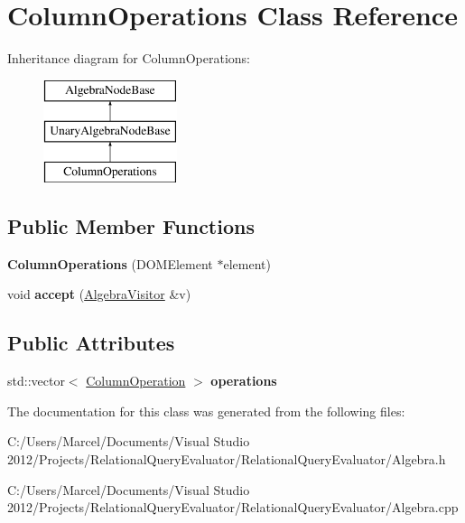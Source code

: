 \hypertarget{class_column_operations}{\section{Column\+Operations Class Reference}
\label{class_column_operations}
}
Inheritance diagram for Column\+Operations\+:\begin{figure}[H]
\begin{center}
\leavevmode
\includegraphics[height=3.000000cm]{class_column_operations}
\end{center}
\end{figure}
\subsection*{Public Member Functions}
\begin{DoxyCompactItemize}
\item 
\hypertarget{class_column_operations_a3d2c43e31201238da369906ef863c959}{{\bfseries Column\+Operations} (D\+O\+M\+Element $\ast$element)}\label{class_column_operations_a3d2c43e31201238da369906ef863c959}

\item 
\hypertarget{class_column_operations_aa33d719aa0407f588cd4ddc2d54368a6}{void {\bfseries accept} (\hyperlink{class_algebra_visitor}{Algebra\+Visitor} \&v)}\label{class_column_operations_aa33d719aa0407f588cd4ddc2d54368a6}

\end{DoxyCompactItemize}
\subsection*{Public Attributes}
\begin{DoxyCompactItemize}
\item 
\hypertarget{class_column_operations_a31aab19a9f8b104f772c111e920dd682}{std\+::vector$<$ \hyperlink{class_column_operation}{Column\+Operation} $>$ {\bfseries operations}}\label{class_column_operations_a31aab19a9f8b104f772c111e920dd682}

\end{DoxyCompactItemize}


The documentation for this class was generated from the following files\+:\begin{DoxyCompactItemize}
\item 
C\+:/\+Users/\+Marcel/\+Documents/\+Visual Studio 2012/\+Projects/\+Relational\+Query\+Evaluator/\+Relational\+Query\+Evaluator/Algebra.\+h\item 
C\+:/\+Users/\+Marcel/\+Documents/\+Visual Studio 2012/\+Projects/\+Relational\+Query\+Evaluator/\+Relational\+Query\+Evaluator/Algebra.\+cpp\end{DoxyCompactItemize}
